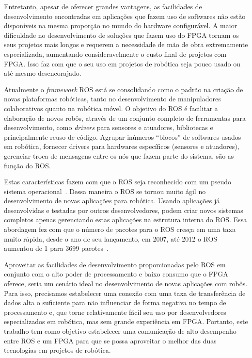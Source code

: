Entretanto, apesar de oferecer grandes vantagens, as facilidades de desenvolvimento encontradas em aplicações que fazem uso de softwares não estão disponíveis na mesma proporção no mundo do hardware configurável. A maior dificuldade no desenvolvimento de soluções que fazem uso do FPGA tornam os seus projetos mais longos e requerem a necessidade de mão de obra extremamente especializada, aumentando consideravelmente o custo final de projetos com FPGA. Isso faz com que o seu uso em projetos de robótica seja pouco usado ou até mesmo desencorajado. 

Atualmente o \textit{framework} ROS está se consolidando como o padrão na criação de novas plataformas robóticas, tanto no desenvolvimento de manipuladores colaborativos quanto na robótica móvel. O objetivo do ROS é facilitar a elaboração de novos robôs, através de um conjunto completo de ferramentas para desenvolvimento, como \textit{drivers} para sensores e atuadores, bibliotecas e principalmente reuso de código. Agrupar inúmeros ``blocos'' de softwares usados em robótica, fornecer drivers para hardwares específicos (sensores e atuadores), gerenciar troca de mensagens entre os nós que fazem parte do sistema, são as função do ROS\@. 

Estas características fazem com que o ROS seja reconhecido com um pseudo sistema operacional~\cite{rosPYO}. Dessa maneira o ROS se tornou muito ágil no desenvolvimento de novas aplicações para robótica. Usando aplicações já desenvolvidas e testadas por outros desenvolvedores, podem criar novos sistemas completos apenas gerenciando estas aplicações na estrutura interna do ROS\@. Essa abordagem fez com que o número de pacotes para o ROS cresça em uma taxa muito rápida, desde o ano de seu lançamento, em 2007, até 2012 o ROS aumentou de 1 para 3699 pacotes~\cite{fpgarobotics}.

Aproveitar as facilidades de desenvolvimento proporcionadas pelo ROS em conjunto com o alto poder de processamento e baixo consumo que o FPGA oferece, seria um cenário ideal no desenvolvimento de novas aplicações com robôs. Para isso, precisamos estabelecer uma conexão com uma taxa de transferência de dados alta o suficiente para não influenciar de forma negativa no tempo de processamento e, que torne relativamente fácil seu uso por desenvolvedores especializados em robótica, mas sem grande experiência em FPGA. Portanto, este trabalho tem como objetivo estabelecer uma comunicação de alto desempenho entre ROS e um FPGA para que se possa aproveitar o melhor das duas tecnologias em projetos de robótica. 

